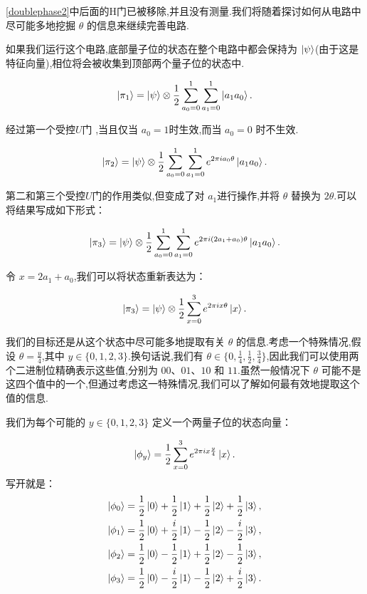 \cref{doublephase2}中后面的H门已被移除,并且没有测量.我们将随着探讨如何从电路中尽可能多地挖掘 $\theta$ 的信息来继续完善电路.

如果我们运行这个电路,底部量子位的状态在整个电路中都会保持为 $\ket{\psi}$(由于这是特征向量),相位将会被收集到顶部两个量子位的状态中.

\begin{equation}
	\ket{\pi_1} = \ket{\psi} \otimes \frac{1}{2} \sum_{a_0=0}^{1} \sum_{a_1=0}^{1} \ket{a_1 a_0}.
\end{equation}

经过第一个受控$U$门 ,当且仅当 $a_0=1$时生效,而当 $a_0=0$ 时不生效.

\begin{equation}
	\ket{\pi_2} = \ket{\psi} \otimes \frac{1}{2} \sum_{a_0=0}^{1} \sum_{a_1=0}^{1} e^{2\pi i a_0 \theta} \ket{a_1 a_0}.
\end{equation}

第二和第三个受控$U$门的作用类似,但变成了对 $a_1$进行操作,并将 $\theta$ 替换为 $2\theta$.可以将结果写成如下形式：

\begin{equation}
	\ket{\pi_3} = \ket{\psi} \otimes \frac{1}{2} \sum_{a_0=0}^{1} \sum_{a_1=0}^{1} e^{2\pi i (2a_1 + a_0)\theta} \ket{a_1 a_0}.
\end{equation}

令 $x=2a_1 + a_0$,我们可以将状态重新表达为：

\begin{equation}
	\ket{\pi_3} = \ket{\psi} \otimes \frac{1}{2} \sum_{x=0}^{3} e^{2\pi ix\theta} \ket{x}.
\end{equation}

我们的目标还是从这个状态中尽可能多地提取有关 $\theta$ 的信息.考虑一个特殊情况,假设 $\theta = \frac{y}{4}$,其中 $y \in \{0,1,2,3\}$.换句话说,我们有 $\theta \in \{0, \frac{1}{4}, \frac{1}{2}, \frac{3}{4}\}$,因此我们可以使用两个二进制位精确表示这些值,分别为 $00$、$01$、$10$ 和 $11$.虽然一般情况下 $\theta$ 可能不是这四个值中的一个,但通过考虑这一特殊情况,我们可以了解如何最有效地提取这个值的信息.

我们为每个可能的 $y \in \{0,1,2,3\}$ 定义一个两量子位的状态向量：

\begin{equation}
	\ket{\phi_y} = \frac{1}{2} \sum_{x=0}^{3} e^{2\pi i x \frac{y}{4}} \ket{x}.
\end{equation}
写开就是：
\begin{equation}
\begin{aligned}
\ket{\phi_0} &= \frac{1}{2} \ket{0} + \frac{1}{2} \ket{1} + \frac{1}{2} \ket{2} + \frac{1}{2} \ket{3}, \\
\ket{\phi_1} &= \frac{1}{2} \ket{0} + \frac{i}{2} \ket{1} - \frac{1}{2} \ket{2} - \frac{i}{2} \ket{3}, \\
\ket{\phi_2} &= \frac{1}{2} \ket{0} - \frac{1}{2} \ket{1} + \frac{1}{2} \ket{2} - \frac{1}{2} \ket{3}, \\
\ket{\phi_3} &= \frac{1}{2} \ket{0} - \frac{i}{2} \ket{1} - \frac{1}{2} \ket{2} + \frac{i}{2} \ket{3}.
\end{aligned}
\end{equation}

